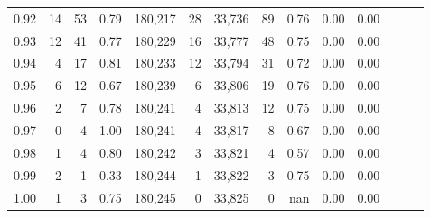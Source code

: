 \begin{tabular}{rrrrrrrrrrrrrr}
0.92 &     14 &   53 &  0.79 &  180,217 &       28 &  33,736 &      89 &  0.76 &  0.00 &      0.00 \\
0.93 &     12 &   41 &  0.77 &  180,229 &       16 &  33,777 &      48 &  0.75 &  0.00 &      0.00 \\
0.94 &      4 &   17 &  0.81 &  180,233 &       12 &  33,794 &      31 &  0.72 &  0.00 &      0.00 \\
0.95 &      6 &   12 &  0.67 &  180,239 &        6 &  33,806 &      19 &  0.76 &  0.00 &      0.00 \\
0.96 &      2 &    7 &  0.78 &  180,241 &        4 &  33,813 &      12 &  0.75 &  0.00 &      0.00 \\
0.97 &      0 &    4 &  1.00 &  180,241 &        4 &  33,817 &       8 &  0.67 &  0.00 &      0.00 \\
0.98 &      1 &    4 &  0.80 &  180,242 &        3 &  33,821 &       4 &  0.57 &  0.00 &      0.00 \\
0.99 &      2 &    1 &  0.33 &  180,244 &        1 &  33,822 &       3 &  0.75 &  0.00 &      0.00 \\
1.00 &      1 &    3 &  0.75 &  180,245 &        0 &  33,825 &       0 &   nan &  0.00 &      0.00 \\
\bottomrule
\end{tabular}
